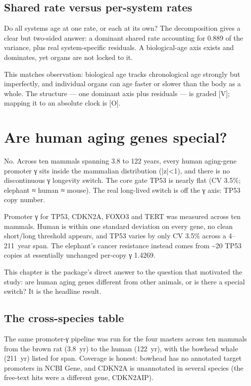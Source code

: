\documentclass[11pt]{article}
\begin{document}
\subsection*{Shared rate versus per-system rates}

Do all systems age at one rate, or each at its own? The decomposition gives a clear but two-sided answer: a dominant shared rate accounting for 0.889 of the variance, plus real system-specific residuals. A biological-age axis exists and dominates, yet organs are not locked to it.

This matches observation: biological age tracks chronological age strongly but imperfectly, and individual organs can age faster or slower than the body as a whole. The structure — one dominant axis plus residuals — is graded [V]; mapping it to an absolute clock is [O].

\section{Are human aging genes special?}

\begin{answerbox}No. Across ten mammals spanning 3.8 to 122 years, every human aging-gene promoter γ sits inside the mammalian distribution (|z|<1), and there is no discontinuous γ longevity switch. The core gate TP53 is nearly flat (CV 3.5\%; elephant ≈ human ≈ mouse). The real long-lived switch is off the γ axis: TP53 copy number.\end{answerbox}

\begin{abstractbox}Promoter γ for TP53, CDKN2A, FOXO3 and TERT was measured across ten mammals. Human is within one standard deviation on every gene, no clean short/long threshold appears, and TP53 varies by only CV 3.5\% across a 4–211 year span. The elephant's cancer resistance instead comes from \textasciitilde{}20 TP53 copies at essentially unchanged per-copy γ 1.4269.\end{abstractbox}

This chapter is the package's direct answer to the question that motivated the study: are human aging genes different from other animals, or is there a special switch? It is the headline result.

\subsection*{The cross-species table}

The same promoter-γ pipeline was run for the four masters across ten mammals from the brown rat (3.8 yr) to the human (122 yr), with the bowhead whale (211 yr) listed for span. Coverage is honest: bowhead has no annotated target promoters in NCBI Gene, and CDKN2A is unannotated in several species (the free-text hits were a different gene, CDKN2AIP).
\end{document}
